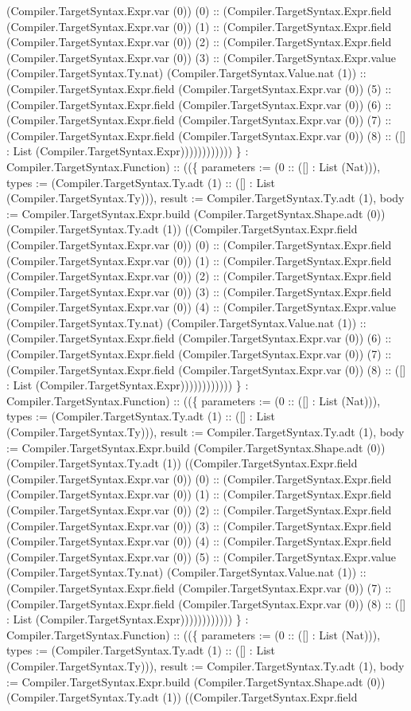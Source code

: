 \documentclass[11pt]{article}
\begin{document}
(Compiler.TargetSyntax.Expr.var (0)) (0) :: (Compiler.TargetSyntax.Expr.field (Compiler.TargetSyntax.Expr.var (0)) (1) :: (Compiler.TargetSyntax.Expr.field (Compiler.TargetSyntax.Expr.var (0)) (2) :: (Compiler.TargetSyntax.Expr.field (Compiler.TargetSyntax.Expr.var (0)) (3) :: (Compiler.TargetSyntax.Expr.value (Compiler.TargetSyntax.Ty.nat) (Compiler.TargetSyntax.Value.nat (1)) :: (Compiler.TargetSyntax.Expr.field (Compiler.TargetSyntax.Expr.var (0)) (5) :: (Compiler.TargetSyntax.Expr.field (Compiler.TargetSyntax.Expr.var (0)) (6) :: (Compiler.TargetSyntax.Expr.field (Compiler.TargetSyntax.Expr.var (0)) (7) :: (Compiler.TargetSyntax.Expr.field (Compiler.TargetSyntax.Expr.var (0)) (8) :: ([] : List (Compiler.TargetSyntax.Expr)))))))))))) \} : Compiler.TargetSyntax.Function) :: ((\{ parameters := (0 :: ([] : List (Nat))), types := (Compiler.TargetSyntax.Ty.adt (1) :: ([] : List (Compiler.TargetSyntax.Ty))), result := Compiler.TargetSyntax.Ty.adt (1), body := Compiler.TargetSyntax.Expr.build (Compiler.TargetSyntax.Shape.adt (0)) (Compiler.TargetSyntax.Ty.adt (1)) ((Compiler.TargetSyntax.Expr.field (Compiler.TargetSyntax.Expr.var (0)) (0) :: (Compiler.TargetSyntax.Expr.field (Compiler.TargetSyntax.Expr.var (0)) (1) :: (Compiler.TargetSyntax.Expr.field (Compiler.TargetSyntax.Expr.var (0)) (2) :: (Compiler.TargetSyntax.Expr.field (Compiler.TargetSyntax.Expr.var (0)) (3) :: (Compiler.TargetSyntax.Expr.field (Compiler.TargetSyntax.Expr.var (0)) (4) :: (Compiler.TargetSyntax.Expr.value (Compiler.TargetSyntax.Ty.nat) (Compiler.TargetSyntax.Value.nat (1)) :: (Compiler.TargetSyntax.Expr.field (Compiler.TargetSyntax.Expr.var (0)) (6) :: (Compiler.TargetSyntax.Expr.field (Compiler.TargetSyntax.Expr.var (0)) (7) :: (Compiler.TargetSyntax.Expr.field (Compiler.TargetSyntax.Expr.var (0)) (8) :: ([] : List (Compiler.TargetSyntax.Expr)))))))))))) \} : Compiler.TargetSyntax.Function) :: ((\{ parameters := (0 :: ([] : List (Nat))), types := (Compiler.TargetSyntax.Ty.adt (1) :: ([] : List (Compiler.TargetSyntax.Ty))), result := Compiler.TargetSyntax.Ty.adt (1), body := Compiler.TargetSyntax.Expr.build (Compiler.TargetSyntax.Shape.adt (0)) (Compiler.TargetSyntax.Ty.adt (1)) ((Compiler.TargetSyntax.Expr.field (Compiler.TargetSyntax.Expr.var (0)) (0) :: (Compiler.TargetSyntax.Expr.field (Compiler.TargetSyntax.Expr.var (0)) (1) :: (Compiler.TargetSyntax.Expr.field (Compiler.TargetSyntax.Expr.var (0)) (2) :: (Compiler.TargetSyntax.Expr.field (Compiler.TargetSyntax.Expr.var (0)) (3) :: (Compiler.TargetSyntax.Expr.field (Compiler.TargetSyntax.Expr.var (0)) (4) :: (Compiler.TargetSyntax.Expr.field (Compiler.TargetSyntax.Expr.var (0)) (5) :: (Compiler.TargetSyntax.Expr.value (Compiler.TargetSyntax.Ty.nat) (Compiler.TargetSyntax.Value.nat (1)) :: (Compiler.TargetSyntax.Expr.field (Compiler.TargetSyntax.Expr.var (0)) (7) :: (Compiler.TargetSyntax.Expr.field (Compiler.TargetSyntax.Expr.var (0)) (8) :: ([] : List (Compiler.TargetSyntax.Expr)))))))))))) \} : Compiler.TargetSyntax.Function) :: ((\{ parameters := (0 :: ([] : List (Nat))), types := (Compiler.TargetSyntax.Ty.adt (1) :: ([] : List (Compiler.TargetSyntax.Ty))), result := Compiler.TargetSyntax.Ty.adt (1), body := Compiler.TargetSyntax.Expr.build (Compiler.TargetSyntax.Shape.adt (0)) (Compiler.TargetSyntax.Ty.adt (1)) ((Compiler.TargetSyntax.Expr.field 
\end{document}
